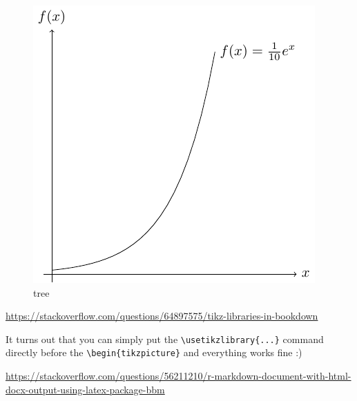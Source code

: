 \documentclass[
]{book}
\newenvironment{Shaded}{\begin{snugshade}}{\end{snugshade}}
\newcommand{\ExtensionTok}[1]{#1}
\newcommand{\FunctionTok}[1]{\textcolor[rgb]{0.13,0.29,0.53}{\textbf{#1}}}
\newcommand{\KeywordTok}[1]{\textcolor[rgb]{0.13,0.29,0.53}{\textbf{#1}}}
\newcommand{\NormalTok}[1]{#1}
\newcommand{\SpecialCharTok}[1]{\textcolor[rgb]{0.81,0.36,0.00}{\textbf{#1}}}
\newcommand{\SpecialStringTok}[1]{\textcolor[rgb]{0.31,0.60,0.02}{#1}}
\theoremstyle{definition}
\theoremstyle{definition}
\theoremstyle{definition}
\theoremstyle{definition}
\theoremstyle{remark}
\begin{document}
\begin{Shaded}
\end{Shaded}

\begin{figure}
\includegraphics[width=0.75\linewidth]{202401311000-TikZ_files/figure-latex/unnamed-chunk-59-1} \caption{tree}\label{fig:unnamed-chunk-59}
\end{figure}

\url{https://stackoverflow.com/questions/64897575/tikz-libraries-in-bookdown}

It turns out that you can simply put the \texttt{\textbackslash{}usetikzlibrary\{...\}} command directly before the \texttt{\textbackslash{}begin\{tikzpicture\}} and everything works fine :)

\url{https://stackoverflow.com/questions/56211210/r-markdown-document-with-html-docx-output-using-latex-package-bbm}
\end{document}
